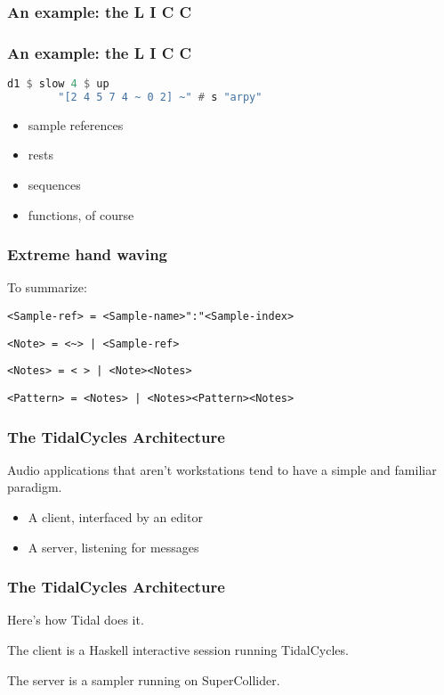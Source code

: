 \documentclass{beamer}
\begin{document}
	\begin{frame}
		\frametitle{An example: the L I C C}
		
	\end{frame}

	\begin{frame}[fragile]
		\frametitle{An example: the L I C C}
		\begin{lstlisting}[language=Haskell,showstringspaces=false]
		d1 $ slow 4 $ up 
		"[2 4 5 7 4 ~ 0 2] ~" # s "arpy"
		\end{lstlisting}
		\begin{itemize}
			\item sample references
			\item rests
			\item sequences
			\item functions, of course
		\end{itemize}
	\end{frame}

	\begin{frame}
		\frametitle{Extreme hand waving}
		To summarize:
		\begin{center}
			\texttt{<Sample-ref> = <Sample-name>":"<Sample-index>}
			
			\texttt{<Note> = <\textasciitilde> | <Sample-ref>}
			
			\texttt{<Notes> = < > | <Note><Notes>}
			
			\texttt{<Pattern> = <Notes> | <Notes><Pattern><Notes>}
			
		\end{center}
	\end{frame}

	\begin{frame}
		\frametitle{The TidalCycles Architecture}
		Audio applications that aren't workstations tend to have a simple and familiar paradigm.
		\begin{itemize}
			\item A client, interfaced by an editor
			\item A server, listening for messages
		\end{itemize}
	\end{frame}

	\begin{frame}
		\frametitle{The TidalCycles Architecture}
		Here's how Tidal does it.
		
		The client is a Haskell interactive session running TidalCycles.
		
		The server is a sampler running on SuperCollider.
	\end{frame}
\end{document}
